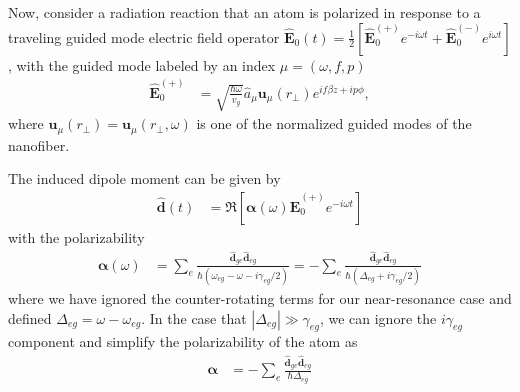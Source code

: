 Now, consider a radiation reaction that an atom is polarized in response to a traveling guided mode electric field operator $ \hat{\mathbf{E}}_0(t)=\frac{1}{2}\left[\hat{\mathbf{E}}^{(+)}_0e^{-i\omega t} +  \hat{\mathbf{E}}^{(-)}_0e^{i\omega t}\right] $, with the guided mode labeled by an index $ \mu = (\omega,f,p)$
\begin{align}
\hat{\mathbf{E}}^{(+)}_0 &= \sqrt{\frac{\hbar \omega}{v_g}} \hat{a}_\mu \mathbf{u}_{\mu} (r\!_\perp) e^{if\beta z+ip\phi},
\end{align} 
where $ \mathbf{u}_{\mu} (r\!_\perp)=\mathbf{u}_\mu(r\!_\perp,\omega) $  is one of the normalized guided modes of the nanofiber. 

The induced dipole moment can be given by
\begin{align}
\hat{\mathbf{d}}(t) 
&= \Re\left[ \boldsymbol{\alpha}(\omega)\hat{\mathbf{E}}_0^{(+)} e^{-i\omega t}\right]
\end{align}
with the polarizability 
\begin{align}\label{Eq::PTensorGen}
\boldsymbol{\alpha}(\omega) &=\sum_e \frac{\hat{\mathbf{d}}_{ge}\hat{\mathbf{d}}_{eg}}{\hbar(\omega_{eg} -\omega -i\gamma_{eg}/2)} =-\sum_e \frac{\hat{\mathbf{d}}_{ge}\hat{\mathbf{d}}_{eg}}{\hbar(\Delta_{eg} +i\gamma_{eg}/2)}
\end{align}
where we have ignored the counter-rotating terms for our near-resonance case and defined $ \Delta_{eg}=\omega-\omega_{eg} $. In the case that $ |\Delta_{eg} |\gg \gamma_{eg} $, we can ignore the $ i\gamma_{eg} $ component and simplify the polarizability of the atom as
\begin{align}
\boldsymbol{\alpha} &= -\sum_e \frac{\hat{\mathbf{d}}_{ge}\hat{\mathbf{d}}_{eg}}{\hbar\Delta_{eg}} 
\end{align} 

